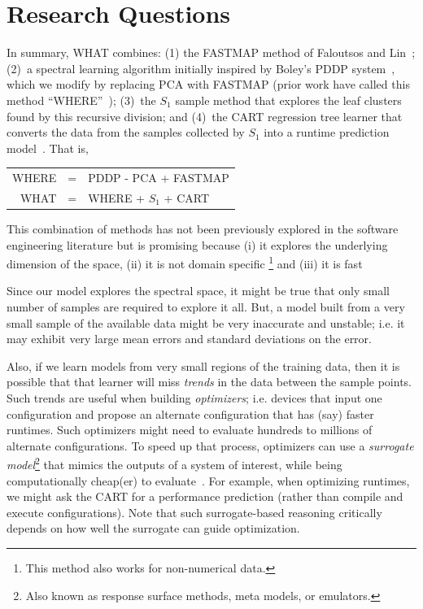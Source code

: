 \documentclass{sig-alternative}
\begin{document}
\section{Research Questions} 
In summary, WHAT  combines:
(1) the FASTMAP method of Faloutsos and Lin~\cite{Faloutsos1995};
(2)~a spectral learning algorithm initially   inspired by    Boley's PDDP system~\cite{boley98}, which we modify
by replacing  PCA with FASTMAP (prior work have called this
method ``WHERE''~\cite{me12d});
(3)~the $S_1$ sample method that explores the leaf clusters found by this recursive division;
and (4)~the CART regression tree learner that converts the data from the samples collected by $S_1$
into a runtime prediction model~\cite{breiman1984}.
That is,
\begin{center}
\begin{tabular}{rcl}
WHERE& = &PDDP - PCA + FASTMAP\\ 
WHAT& =  & WHERE + $S_1$ + CART
\end{tabular}
\end{center}
This combination of methods has not been previously explored in the
software engineering literature but is promising because (i) it explores the underlying dimension of the space, (ii) it is not domain specific \footnote{This method also works for non-numerical data.} and (iii) it is fast 


Since our model explores the spectral space, it might be true that only small
number of samples are required to explore it all.
But, a model built from a very small sample of the available data might
be very inaccurate and unstable; i.e. it may exhibit very large mean errors and standard deviations on the error.

Also, if we learn models from very small regions of the training data,
then it is  possible that that learner will miss {\em trends} in the data
between the sample points. Such trends are useful when building {\em optimizers};
i.e. devices that input one configuration and propose an alternate
configuration that has (say) faster runtimes. Such optimizers might
need to evaluate hundreds to millions of alternate configurations. 
To speed up that process, optimizers can use a {\em surrogate model}\footnote{Also known as response surface methods, meta models, or emulators.}
that  mimics the outputs of a system of interest, while being computationally cheap(er) to evaluate~\cite{loshchilov13}. For example, when optimizing
runtimes, we might ask the CART  for a performance
prediction (rather than compile and execute
configurations).  Note that such surrogate-based
reasoning critically depends on how well the surrogate can guide optimization.
\end{document}
